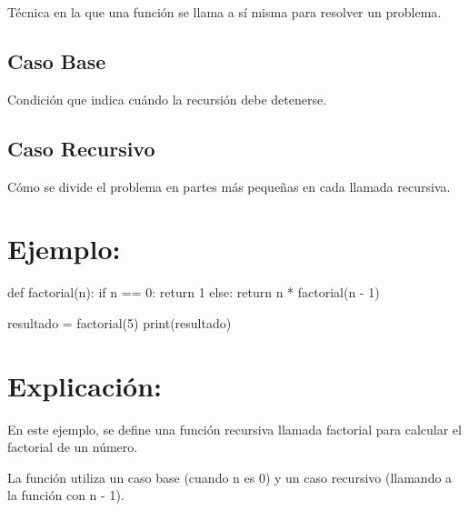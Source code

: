 \documentclass[
  a4paper,
  DIV=11,
  numbers=noendperiod,
  onepage,
  openany]{scrreprt}
\newenvironment{Shaded}{\begin{snugshade}}{\end{snugshade}}
\newcommand{\BuiltInTok}[1]{\textcolor[rgb]{0.00,0.23,0.31}{#1}}
\newcommand{\ControlFlowTok}[1]{\textcolor[rgb]{0.00,0.23,0.31}{#1}}
\newcommand{\DecValTok}[1]{\textcolor[rgb]{0.68,0.00,0.00}{#1}}
\newcommand{\KeywordTok}[1]{\textcolor[rgb]{0.00,0.23,0.31}{#1}}
\newcommand{\NormalTok}[1]{\textcolor[rgb]{0.00,0.23,0.31}{#1}}
\newcommand{\OperatorTok}[1]{\textcolor[rgb]{0.37,0.37,0.37}{#1}}
\begin{document}
Técnica en la que una función se llama a sí misma para resolver un
problema.

\hypertarget{caso-base}{%
\subsection{Caso Base}\label{caso-base}}

Condición que indica cuándo la recursión debe detenerse.

\hypertarget{caso-recursivo}{%
\subsection{Caso Recursivo}\label{caso-recursivo}}

Cómo se divide el problema en partes más pequeñas en cada llamada
recursiva.

\hypertarget{ejemplo-46}{%
\section{Ejemplo:}\label{ejemplo-46}}

\begin{Shaded}
\begin{Highlighting}[]
\KeywordTok{def}\NormalTok{ factorial(n):}
    \ControlFlowTok{if}\NormalTok{ n }\OperatorTok{==} \DecValTok{0}\NormalTok{:}
        \ControlFlowTok{return} \DecValTok{1}
    \ControlFlowTok{else}\NormalTok{:}
        \ControlFlowTok{return}\NormalTok{ n }\OperatorTok{*}\NormalTok{ factorial(n }\OperatorTok{{-}} \DecValTok{1}\NormalTok{)}

\NormalTok{resultado }\OperatorTok{=}\NormalTok{ factorial(}\DecValTok{5}\NormalTok{)}
\BuiltInTok{print}\NormalTok{(resultado)}
\end{Highlighting}
\end{Shaded}

\hypertarget{explicaciuxf3n-46}{%
\section{Explicación:}\label{explicaciuxf3n-46}}

En este ejemplo, se define una función recursiva llamada factorial para
calcular el factorial de un número.

La función utiliza un caso base (cuando n es 0) y un caso recursivo
(llamando a la función con n - 1).
\end{document}
